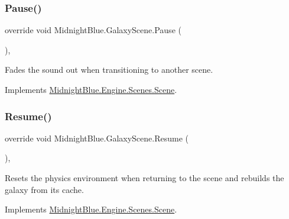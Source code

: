 \subsubsection{\texorpdfstring{Pause()}{Pause()}}
{\footnotesize\ttfamily override void Midnight\+Blue.\+Galaxy\+Scene.\+Pause (\begin{DoxyParamCaption}{ }\end{DoxyParamCaption})\hspace{0.3cm}{\ttfamily [inline]}, {\ttfamily [virtual]}}



Fades the sound out when transitioning to another scene. 



Implements \hyperlink{class_midnight_blue_1_1_engine_1_1_scenes_1_1_scene_aeb3c4d9bea0177d21fbffcdabab660de}{Midnight\+Blue.\+Engine.\+Scenes.\+Scene}.

\hypertarget{class_midnight_blue_1_1_galaxy_scene_ab641e6727cdb64dc6487e9a229521692}{}\label{class_midnight_blue_1_1_galaxy_scene_ab641e6727cdb64dc6487e9a229521692} 
\subsubsection{\texorpdfstring{Resume()}{Resume()}}
{\footnotesize\ttfamily override void Midnight\+Blue.\+Galaxy\+Scene.\+Resume (\begin{DoxyParamCaption}{ }\end{DoxyParamCaption})\hspace{0.3cm}{\ttfamily [inline]}, {\ttfamily [virtual]}}



Resets the physics environment when returning to the scene and rebuilds the galaxy from its cache. 



Implements \hyperlink{class_midnight_blue_1_1_engine_1_1_scenes_1_1_scene_ab7cd837b20785116007a4732d90bc548}{Midnight\+Blue.\+Engine.\+Scenes.\+Scene}.


